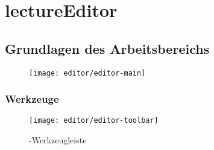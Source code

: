 \chapter{lectureEditor}

\section{Grundlagen des Arbeitsbereichs}

\begin{figure}[H]
	\centering
	\texttt{[image: editor/editor-main]}
	\caption{\lectEditor}
	\label{fig:\lectEditor}
\end{figure}

\subsection{Werkzeuge}
\label{section:editor:toolbar}

\begin{figure}[H]
	\centering
	\texttt{[image: editor/editor-toolbar]}
	\caption{\lectEditor{}-Werkzeugleiste}
	\label{fig:editor-toolbar}
\end{figure}


